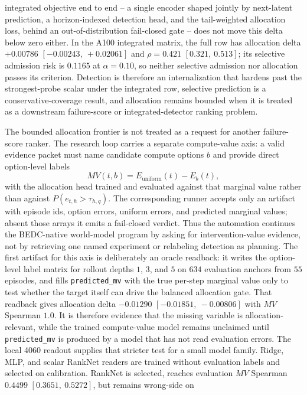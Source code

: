integrated objective end to end -- a single encoder shaped jointly by
next-latent prediction, a horizon-indexed detection head, and the tail-weighted
allocation loss, behind an out-of-distribution fail-closed gate -- does not move
this delta below zero either.  In the A100 integrated matrix, the full row has
allocation delta $+0.00786$ $[-0.00243,\ +0.02061]$ and
$\rho=0.421$ $[0.321,\ 0.513]$; its selective admission risk is $0.1165$ at
$\alpha=0.10$, so neither selective admission nor allocation passes its
criterion.  Detection is therefore an internalization that hardens past the
strongest-probe scalar under the integrated row, selective prediction is a
conservative-coverage result, and allocation remains bounded when it is treated
as a downstream failure-score or integrated-detector ranking problem.

The bounded allocation frontier is not treated as a request for another
failure-score ranker.  The research loop carries a separate compute-value axis:
a valid evidence packet must name candidate compute options $b$ and provide
direct option-level labels
$$
MV(t,b) = E_{\mathrm{uniform}}(t) - E_b(t),
$$
with the allocation head trained and evaluated against that marginal value
rather than against $P(e_{t,h}>\tau_{h,q})$.  The corresponding runner accepts
only an artifact with episode ids, option errors, uniform errors, and predicted
marginal values; absent those arrays it emits a fail-closed verdict.  Thus the
automation continues the BEDC-native world-model program by asking for
intervention-value evidence, not by retrieving one named experiment or
relabeling detection as planning.
The first artifact for this axis is deliberately an oracle readback: it writes
the option-level label matrix for rollout depths $1$, $3$, and $5$ on $634$
evaluation anchors from $55$ episodes, and fills \texttt{predicted\_mv} with
the true per-step marginal value only to test whether the target itself can
drive the balanced allocation gate.  That readback gives allocation delta
$-0.01290$ $[-0.01851,\ -0.00806]$ with $MV$ Spearman $1.0$.  It is therefore
evidence that the missing variable is allocation-relevant, while the trained
compute-value model remains unclaimed until \texttt{predicted\_mv} is produced
by a model that has not read evaluation errors.
The local 4060 readout supplies that stricter test for a small model family.
Ridge, MLP, and scalar RankNet readers are trained without evaluation labels
and selected on calibration.  RankNet is selected, reaches evaluation
$MV$ Spearman $0.4499$ $[0.3651,\ 0.5272]$, but remains wrong-side on

